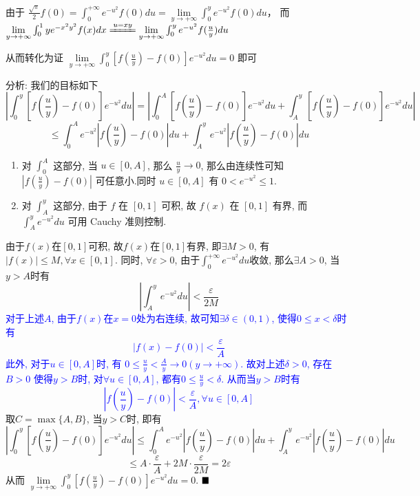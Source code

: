 \documentclass[lang=cn,newtx,10pt,scheme=chinese]{elegantbook}
\begin{document}
\begin{remark}
由于
$\frac{\sqrt{\pi}}{2}f(0) = \int_{0}^{+\infty} e^{-u^2}f(0)du = \lim\limits_{y \to +\infty} \int_{0}^{y} e^{-u^2}f(0)du$，
而 $\lim\limits_{y \to +\infty} \int_{0}^{1} ye^{-x^2y^2}f(x)dx \xlongequal{u=xy} \lim\limits_{y \to +\infty} \int_{0}^{y} e^{-u^2}f(\frac{u}{y})du$

从而转化为证 $\lim\limits_{y \to +\infty} \int_{0}^{y} [f(\frac{u}{y})-f(0)]e^{-u^2}du = 0$ 即可

分析: 我们的目标如下
$$ |\int_{0}^{y} [f(\frac{u}{y})-f(0)]e^{-u^2}du| = |\int_{0}^{A} [f(\frac{u}{y})-f(0)]e^{-u^2}du + \int_{A}^{y} [f(\frac{u}{y})-f(0)]e^{-u^2}du| $$
$$ \le \int_{0}^{A} e^{-u^2}|f(\frac{u}{y})-f(0)|du + \int_{A}^{y} e^{-u^2}|f(\frac{u}{y})-f(0)|du $$
\begin{enumerate}
    \item 对 $\int_{0}^{A}$ 这部分, 当 $u \in [0,A]$, 那么 $\frac{u}{y} \to 0$, 那么由连续性可知 $|f(\frac{u}{y})-f(0)|$ 可任意小.同时 $u \in [0,A]$ 有 $0 < e^{-u^2} \le 1$.
    \item 对 $\int_{A}^{y}$ 这部分, 由于 $f$ 在 $[0,1]$ 可积, 故 $f(x)$ 在 $[0,1]$ 有界, 而 $\int_{A}^{y} e^{-u^2}du$ 可用 Cauchy 准则控制.
\end{enumerate}
\end{remark}

\begin{solution}
由于$f(x)$在$[0,1]$可积, 故$f(x)$在$[0,1]$有界, 即$\exists M>0$, 有$|f(x)| \le M, \forall x \in [0,1]$.
同时, $\forall \varepsilon>0$, 由于$\int_{0}^{+\infty} e^{-u^2}du$收敛, 那么$\exists A>0$, 当$y>A$时有
$$ |\int_{A}^{y} e^{-u^2}du| < \frac{\varepsilon}{2M} $$
\textcolor{blue}{对于上述$A$, 由于$f(x)$在$x=0$处为右连续, 故可知$\exists \delta \in (0,1)$, 使得$0 \le x < \delta$时有
$$ |f(x)-f(0)| < \frac{\varepsilon}{A} $$
此外, 对于$u \in [0,A]$时, 有 $0 \le \frac{u}{y} < \frac{A}{y} \to 0 (y \to +\infty)$. 故对上述$\delta>0$, 存在$B>0$
使得$y>B$时, 对$\forall u \in [0,A]$, 都有$0 \le \frac{u}{y} < \delta$. 从而当$y>B$时有
$$ |f(\frac{u}{y}) - f(0)| < \frac{\varepsilon}{A}, \forall u \in [0,A] $$}
取$C = \max\{A,B\}$, 当$y>C$时, 即有
$$ |\int_{0}^{y} [f(\frac{u}{y})-f(0)]e^{-u^2}du| \le \int_{0}^{A} e^{-u^2}|f(\frac{u}{y})-f(0)|du + \int_{A}^{y} e^{-u^2}|f(\frac{u}{y})-f(0)|du $$
$$ \le A \cdot \frac{\varepsilon}{A} + 2M \cdot \frac{\varepsilon}{2M} = 2\varepsilon $$
从而 $\lim\limits_{y \to +\infty} \int_{0}^{y} [f(\frac{u}{y})-f(0)]e^{-u^2}du = 0$.
$\hfill \blacksquare$

\end{solution}
\end{document}
